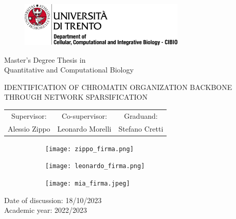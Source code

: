 \graphicspath{{chapters/00_title_page/images/}}

\pagestyle{empty}

\begin{center}
  
  \vspace*{1 cm}
  \begin{figure}[h]
    \centering
    \includegraphics[width=0.7\textwidth]{logo_unitn.png}
  \end{figure}
  \vspace{2 cm}

  \LARGE{Master's Degree Thesis in\\Quantitative and Computational Biology\\}  

  \vspace{2 cm}
  \LARGE\textsc{IDENTIFICATION OF CHROMATIN ORGANIZATION BACKBONE THROUGH NETWORK SPARSIFICATION\\}
  \vspace{2 cm}

  \begin{tabular}{c@{\hskip 2cm}c@{\hskip 2cm}c}
    Supervisor: & Co-supervisor: & Graduand: \\
    Alessio Zippo & Leonardo Morelli & Stefano Cretti
  \end{tabular}
  
  \begin{figure}[h]
    \centering
    
    \hspace{0.5 cm}
    \begin{subfigure}{0.25\textwidth}
      \texttt{[image: zippo\_firma.png]}
    \end{subfigure}
    \hfill
    \begin{subfigure}{0.25\textwidth}
      \texttt{[image: leonardo\_firma.png]}
    \end{subfigure}
    \hfill
    \begin{subfigure}{0.25\textwidth}
      \texttt{[image: mia\_firma.jpeg]}
    \end{subfigure}
    \hspace{0.5 cm}

  \end{figure}

  \vspace{2 cm}

\end{center}

\begin{flushleft}
  \LARGE{Date of discussion: 18/10/2023}\\
  \vspace{0.5 cm}
  \LARGE{Academic year: 2022/2023}\\
\end{flushleft}

\maketitle
